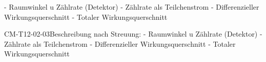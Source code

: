 - Raumwinkel u Zählrate (Detektor)
- Zählrate als Teilchenstrom
- Differenzieller Wirkungsquerschnitt
- Totaler Wirkungsquerschnitt

\begin{DEF}{CM-T12-02-03}{Beschreibung nach Streuung:
- Raumwinkel u Zählrate (Detektor)
- Zählrate als Teilchenstrom
- Differenzieller Wirkungsquerschnitt
- Totaler Wirkungsquerschnitt}
\end{DEF}
